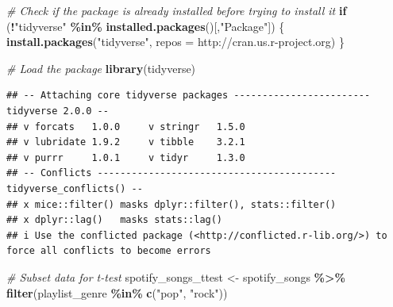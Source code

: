 \documentclass[
  b5paper]{book}
\newenvironment{Shaded}{\begin{snugshade}}{\end{snugshade}}
\newcommand{\AttributeTok}[1]{\textcolor[rgb]{0.13,0.29,0.53}{#1}}
\newcommand{\CommentTok}[1]{\textcolor[rgb]{0.56,0.35,0.01}{\textit{#1}}}
\newcommand{\ConstantTok}[1]{\textcolor[rgb]{0.56,0.35,0.01}{#1}}
\newcommand{\ControlFlowTok}[1]{\textcolor[rgb]{0.13,0.29,0.53}{\textbf{#1}}}
\newcommand{\FunctionTok}[1]{\textcolor[rgb]{0.13,0.29,0.53}{\textbf{#1}}}
\newcommand{\NormalTok}[1]{#1}
\newcommand{\OtherTok}[1]{\textcolor[rgb]{0.56,0.35,0.01}{#1}}
\newcommand{\SpecialCharTok}[1]{\textcolor[rgb]{0.81,0.36,0.00}{\textbf{#1}}}
\newcommand{\StringTok}[1]{\textcolor[rgb]{0.31,0.60,0.02}{#1}}
\begin{document}
\begin{Shaded}
\begin{Highlighting}[]
\CommentTok{\# Check if the package is already installed before trying to install it}
\ControlFlowTok{if}\NormalTok{ (}\SpecialCharTok{!}\StringTok{"tidyverse"} \SpecialCharTok{\%in\%} \FunctionTok{installed.packages}\NormalTok{()[,}\StringTok{"Package"}\NormalTok{]) \{}
  \FunctionTok{install.packages}\NormalTok{(}\StringTok{"tidyverse"}\NormalTok{, }\AttributeTok{repos =} \StringTok{\textquotesingle{}http://cran.us.r{-}project.org\textquotesingle{}}\NormalTok{)}
\NormalTok{\}}

\CommentTok{\# Load the package}
\FunctionTok{library}\NormalTok{(tidyverse)}
\end{Highlighting}
\end{Shaded}

\begin{verbatim}
## -- Attaching core tidyverse packages ------------------------ tidyverse 2.0.0 --
## v forcats   1.0.0     v stringr   1.5.0
## v lubridate 1.9.2     v tibble    3.2.1
## v purrr     1.0.1     v tidyr     1.3.0
## -- Conflicts ------------------------------------------ tidyverse_conflicts() --
## x mice::filter() masks dplyr::filter(), stats::filter()
## x dplyr::lag()   masks stats::lag()
## i Use the conflicted package (<http://conflicted.r-lib.org/>) to force all conflicts to become errors
\end{verbatim}

\begin{Shaded}
\begin{Highlighting}[]
\CommentTok{\# Subset data for t{-}test}
\NormalTok{spotify\_songs\_ttest }\OtherTok{\textless{}{-}}\NormalTok{ spotify\_songs }\SpecialCharTok{\%\textgreater{}\%}
  \FunctionTok{filter}\NormalTok{(playlist\_genre }\SpecialCharTok{\%in\%} \FunctionTok{c}\NormalTok{(}\StringTok{"pop"}\NormalTok{, }\StringTok{"rock"}\NormalTok{))}
\end{Highlighting}
\end{Shaded}

\begin{Shaded}
\end{Shaded}
\end{document}
